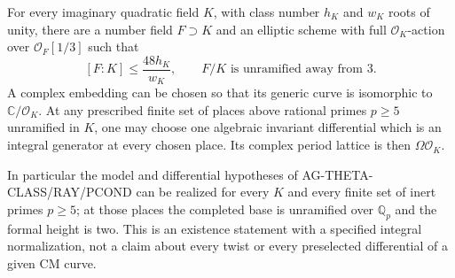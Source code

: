 \begin{proposition}
For every imaginary quadratic field $K$, with class number $h_K$
and $w_K$ roots of unity, there are a number field $F\supset K$
and an elliptic scheme with full $\mathcal O_K$-action over
$\mathcal O_F[1/3]$ such that
\[
 [F:K]\le\frac{48h_K}{w_K},\qquad
 F/K\text{ is unramified away from }3.
\]
A complex embedding can be chosen so that its generic curve is
isomorphic to $\mathbb C/\mathcal O_K$. At any prescribed finite
set of places above rational primes $p\ge5$ unramified in $K$,
one may choose one algebraic invariant differential which is
an integral generator at every chosen place. Its complex period
lattice is then $\Omega\mathcal O_K$.

In particular the model and differential hypotheses of
AG-THETA-CLASS/RAY/PCOND can be realized for every $K$ and every
finite set of inert primes $p\ge5$; at those places the completed
base is unramified over $\mathbb Q_p$ and the formal height is two.
This is an existence statement with a specified integral
normalization, not a claim about every twist or every preselected
differential of a given CM curve.
\end{proposition}
